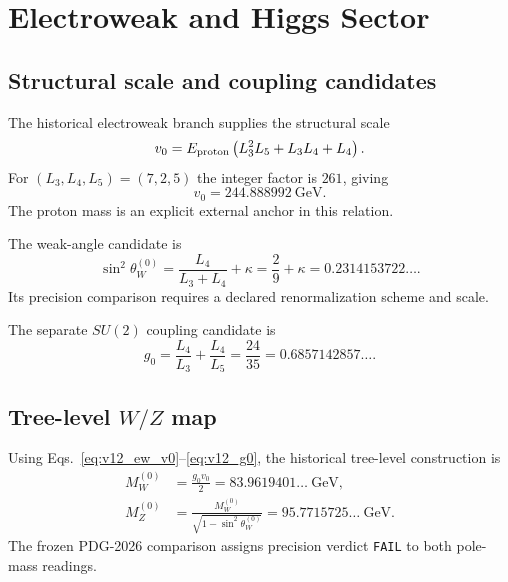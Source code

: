 \chapter{Electroweak and Higgs Sector}
\label{ch:v12_electroweak_higgs}

\section{Structural scale and coupling candidates}

The historical electroweak branch supplies the structural scale
\begin{equation}
v_0
=E_{\rm proton}\left(L_3^2L_5+L_3L_4+L_4\right).
\label{eq:v12_ew_v0}
\end{equation}
For $(L_3,L_4,L_5)=(7,2,5)$ the integer factor is $261$, giving
\begin{equation}
\boxed{v_0=244.888992\ \mathrm{GeV}}.
\end{equation}
The proton mass is an explicit external anchor in this relation.

The weak-angle candidate is
\begin{equation}
\boxed{
\sin^2\theta_W^{(0)}
=\frac{L_4}{L_3+L_4}+\kappa
=\frac29+\kappa
=0.2314153722\ldots .
}
\label{eq:v12_sin2w0}
\end{equation}
Its precision comparison requires a declared renormalization scheme and scale.

The separate $SU(2)$ coupling candidate is
\begin{equation}
\boxed{
g_0=\frac{L_4}{L_3}+\frac{L_4}{L_5}
=\frac{24}{35}
=0.6857142857\ldots .
}
\label{eq:v12_g0}
\end{equation}

\section[Tree-level W/Z map]{Tree-level $W/Z$ map}

Using Eqs.~\eqref{eq:v12_ew_v0}--\eqref{eq:v12_g0}, the historical tree-level construction is
\begin{align}
M_W^{(0)}&=\frac{g_0v_0}{2}
=83.9619401\ldots\ \mathrm{GeV},\\
M_Z^{(0)}&=\frac{M_W^{(0)}}{\sqrt{1-\sin^2\theta_W^{(0)}}}
=95.7715725\ldots\ \mathrm{GeV}.
\end{align}
The frozen PDG-2026 comparison assigns precision verdict \texttt{FAIL} to both pole-mass readings.

